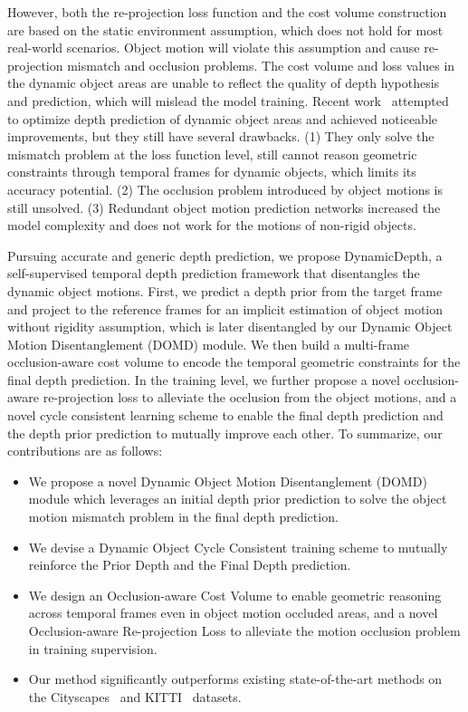 \documentclass[runningheads]{llncs}
\begin{document}
However, both the re-projection loss function and the cost volume construction are based on the static environment assumption, which does not hold for most real-world scenarios. Object motion will violate this assumption and cause re-projection mismatch and occlusion problems. The cost volume and loss values in the dynamic object areas are unable to reflect the quality of depth hypothesis and prediction, which will mislead the model training. 
Recent work~\cite{sgdepth,monodepth2,frozen,instadm} attempted to optimize depth prediction of dynamic object areas and achieved noticeable improvements, but they still have several drawbacks. (1) They only solve the mismatch problem at the loss function level, still cannot reason geometric constraints through temporal frames for dynamic objects, which limits its accuracy potential. (2) The occlusion problem introduced by object motions is still unsolved. (3) Redundant object motion prediction networks increased the model complexity and does not work for the motions of non-rigid objects.

Pursuing accurate and generic depth prediction, we propose DynamicDepth, a self-supervised temporal depth prediction framework that disentangles the dynamic object motions. First, we predict a depth prior from the target frame and project to the reference frames for an implicit estimation of object motion without rigidity assumption, which is later disentangled by our Dynamic Object Motion Disentanglement (DOMD) module. We then build a multi-frame occlusion-aware cost volume to encode the temporal geometric constraints for the final depth prediction. In the training level, we further propose a novel occlusion-aware re-projection loss to alleviate the occlusion from the object motions, and a novel cycle consistent learning scheme to enable the final depth prediction and the depth prior prediction to mutually improve each other. To summarize, our contributions are as follows:


\begin{itemize}
    \item We propose a novel Dynamic Object Motion Disentanglement (DOMD) module which leverages an initial depth prior prediction to solve the object motion mismatch problem in the final depth prediction.
    \item We devise a Dynamic Object Cycle Consistent training scheme to mutually reinforce the Prior Depth and the Final Depth prediction.
    \item We design an Occlusion-aware Cost Volume to enable geometric reasoning across temporal frames even in object motion occluded areas, and a novel Occlusion-aware Re-projection Loss to alleviate the motion occlusion problem in training supervision.
    \item Our method significantly outperforms existing state-of-the-art methods on the Cityscapes~\cite{Cityscapes} and KITTI~\cite{kitti} datasets.
\end{itemize}
\end{document}
